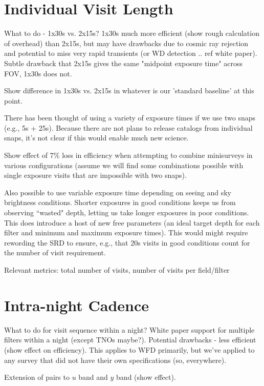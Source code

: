 




\section{Individual Visit Length}
What to do - 1x30s vs. 2x15s? 1x30s much more efficient (show rough calculation of overhead) than 2x15s, but may have drawbacks due to cosmic ray rejection and potential to miss very rapid transients (or WD detection .. ref white paper). Subtle drawback that 2x15s gives the same "midpoint exposure time" across FOV, 1x30s does not. 

Show difference in 1x30s vs. 2x15s in whatever is our 'standard baseline' at this point. 

There has been thought of using a variety of exposure times if we use two snaps (e.g., 5s + 25s). Because there are not plans to release catalogs from individual snaps, it's not clear if this would enable much new science.

Show effect of 7\% loss in efficiency when attempting to combine minisurveys in various configurations (assume we will find some combinations possible with single exposure visits that are impossible with two snaps). 

Also possible to use variable exposure time depending on seeing and sky brightness conditions. Shorter exposures in good conditions keeps us from observing ``wasted" depth, letting us take longer exposures in poor conditions. This does introduce a host of new free parameters (an ideal target depth for each filter and minimum and maximum exposure times).  This would might require rewording the SRD to ensure, e.g., that 20s visits in good conditions count for the number of visit requirement.

Relevant metrics: total number of visits, number of visits per field/filter

\section{Intra-night Cadence}
What to do for visit sequence within a night? White paper support for multiple filters within a night (except TNOs maybe?). Potential drawbacks - less efficient (show effect on efficiency). This applies to WFD primarily, but we've applied to any survey that did not have their own specifications (so, everywhere). 

Extension of pairs to $u$ band and $y$ band (show effect). 


